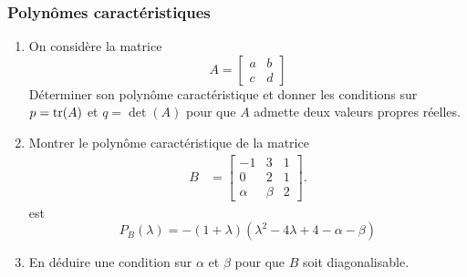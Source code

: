 \subsubsection{Polynômes caractéristiques}

  \begin{enumerate}
  \item On considère la matrice 
  $$
  A = \left[\begin{array}{cc} a & b \\ c & d\end{array}\right]
  $$
  Déterminer son polynôme caractéristique et donner les conditions sur $p = \operatorname{tr}(A)$ et $q = \det(A)$ pour que $A$ admette deux valeurs propres réelles.
  \item Montrer le polynôme caractéristique de la matrice 
  \begin{align*}
    B & = \left[\begin{array}{rrr}
      -1 & 3 & 1 \\ 0 & 2 & 1 \\ \alpha & \beta & 2
      \end{array}\right].  
  \end{align*}
  est
  $$
  P_B(\lambda) = -(1+\lambda)(\lambda^2 - 4 \lambda + 4 - \alpha - \beta)
  $$
  \item En déduire une condition sur $\alpha$ et $\beta$ pour que $B$ soit diagonalisable.
\end{enumerate}

